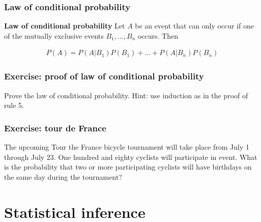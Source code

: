 \begin{frame}
    \frametitle{Law of conditional probability}

    \begin{probRule}
        \textbf{Law of conditional probability} Let $A$ be an event that
            can only occur if one of the mutually exclusive events
            $B_1,\ldots,B_n$ occurs. Then

            \begin{align*}
                P(A) = P(A|B_1) P(B_1) + \ldots + P(A|B_n) P(B_n)  
            \end{align*}
    \end{probRule}

\end{frame}

\begin{frame}
    \frametitle{Exercise: proof of law of conditional probability}

    Prove the law of conditional probability. Hint: use induction as in the
    proof of rule 5.

\end{frame}

\begin{frame}
    \frametitle{Exercise: tour de France}

    \begin{manualProbExample}{8.6}
        The upcoming Tour the France bicycle tournament will take place from
        July 1 through July 23. One hundred and eighty cyclists will
        participate in event. What is the probability that two or more
        participating cyclists will have birthdays on the same day during the
        tournament?
    \end{manualProbExample}

\end{frame}

\section{Statistical inference}

